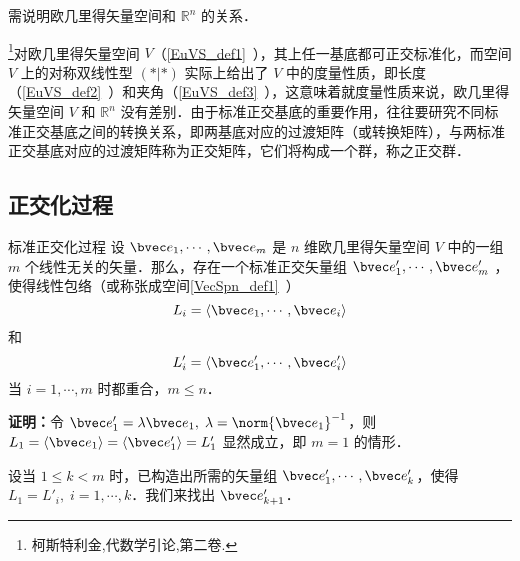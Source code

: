 
\begin{issues}
\issueTODO 需说明欧几里得矢量空间和 $\mathbb{R}^n$ 的关系．
\end{issues}

\footnote{柯斯特利金,代数学引论,第二卷.}对欧几里得矢量空间 $V$（\autoref{EuVS_def1}~），其上任一基底都可正交标准化，而空间 $V$ 上的对称双线性型 $(*|*)$ 实际上给出了 $V$ 中的度量性质，即长度（\autoref{EuVS_def2}~）和夹角（\autoref{EuVS_def3}~），这意味着就度量性质来说，欧几里得矢量空间 $V$ 和 $\mathbb{R}^n$ 没有差别．由于标准正交基底的重要作用，往往要研究不同标准正交基底之间的转换关系，即两基底对应的过渡矩阵（或转换矩阵），与两标准正交基底对应的过渡矩阵称为正交矩阵，它们将构成一个群，称之正交群．
\subsection{正交化过程}
\begin{theorem}{标准正交化过程}\label{EVOIOG_the1}
设 $\bvec e_1,\cdots,\bvec e_m$ 是 $n$ 维欧几里得矢量空间 $V$ 中的一组 $m$ 个线性无关的矢量．那么，存在一个标准正交矢量组 $\bvec e'_1,\cdots,\bvec e'_m$ ，使得线性包络（或称张成空间\autoref{VecSpn_def1}~）
\begin{equation}
L_i=\langle\bvec e_1,\cdots,\bvec e_i\rangle
\end{equation}
和
\begin{equation}
L'_i=\langle\bvec e'_1,\cdots,\bvec e'_i\rangle
\end{equation}
当 $i=1,\cdots,m$ 时都重合，$m\leq n$．
\end{theorem}
\textbf{证明：}令 $\bvec e'_1=\lambda\bvec e_1,\;\lambda=\norm{\bvec e_1}^{-1}$，则 $L_1=\langle\bvec e_1\rangle=\langle \bvec e'_1\rangle=L'_1$ 显然成立，即 $m=1$ 的情形．

设当 $1\leq k<m$ 时，已构造出所需的矢量组 $\bvec e'_1,\cdots,\bvec e'_k$，使得 $L_1=L'_i,\;i=1,\cdots,k$．我们来找出 $\bvec e'_{k+1}$．

